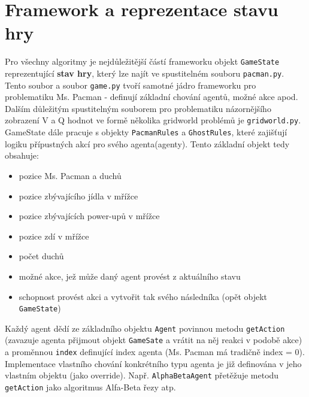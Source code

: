 \section{Framework a reprezentace stavu hry}
Pro všechny algoritmy je nejdůležitější částí frameworku objekt \texttt{GameState} reprezentující \textbf{stav hry}, který lze najít ve spustitelném souboru \texttt{pacman.py}. Tento soubor a soubor \texttt{game.py} tvoří samotné jádro frameworku pro problematiku Ms. Pacman - definují základní chování agentů, možné akce apod.
Dalším důležitým spustitelným souborem pro problematiku názornějšího zobrazení V a Q hodnot ve formě několika gridworld problémů je \texttt{gridworld.py}.
GameState dále pracuje s objekty \texttt{PacmanRules} a \texttt{GhostRules}, které zajišťují logiku přípustných akcí pro svého agenta(agenty).
Tento základní objekt tedy obsahuje:
\begin{itemize}
\item pozice Ms. Pacman a duchů
\item pozice zbývajícího jídla v mřížce
\item pozice zbývajících power-upů v mřížce
\item pozice zdí v mřížce
\item počet duchů
\item možné akce, jež může daný agent provést z aktuálního stavu
\item schopnost provést akci a vytvořit tak svého následníka (opět objekt \texttt{GameState})
\end{itemize}
Každý agent dědí ze základního objektu \texttt{Agent} povinnou metodu \texttt{getAction} (zavazuje agenta přijmout objekt \texttt{GameSate} a vrátit na něj reakci v podobě akce) a proměnnou \texttt{index} definující index agenta (Ms. Pacman má tradičně index = 0).
Implementace vlastního chování konkrétního typu agenta je již definována v jeho vlastním objektu (jako override). Např. \texttt{AlphaBetaAgent} přetěžuje metodu \texttt{getAction} jako algoritmus Alfa-Beta řezy atp.

